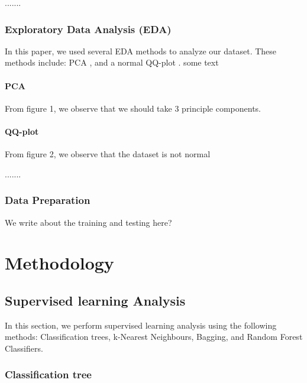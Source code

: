 \documentclass[12pt]{article}
\begin{document}
.......

\subsubsection{Exploratory Data Analysis (EDA)}
In this paper, we used several EDA methods to analyze our dataset. These methods include: PCA \cite{kurita2019principal}, and a normal QQ-plot \cite{marden2004positions}. some text \cite{Lecture2}
\paragraph{PCA}

From figure 1, we observe that we should take 3 principle components.



\paragraph{QQ-plot}

From figure 2, we observe that the dataset is not normal


.......
\subsubsection{Data Preparation} 

We write about the training and testing here?\\

\section{Methodology}
\subsection{Supervised learning Analysis} 
 In this section, we perform supervised learning analysis using the following methods: Classification trees, k-Nearest Neighbours, Bagging, and Random Forest Classifiers.\cite{zhou2012ensemble}
 
 \subsubsection{Classification tree}
 
\end{document}
